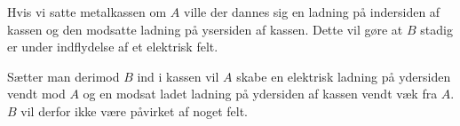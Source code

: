 Hvis vi satte metalkassen om $A$ ville der dannes sig en ladning på indersiden af kassen og den modsatte ladning på ysersiden af kassen. Dette vil gøre at $B$ stadig er under indflydelse af et elektrisk felt.

Sætter man derimod $B$ ind i kassen vil $A$ skabe en elektrisk ladning på ydersiden vendt mod $A$ og en modsat ladet ladning på ydersiden af kassen vendt væk fra $A$. $B$ vil derfor ikke være påvirket af noget felt.